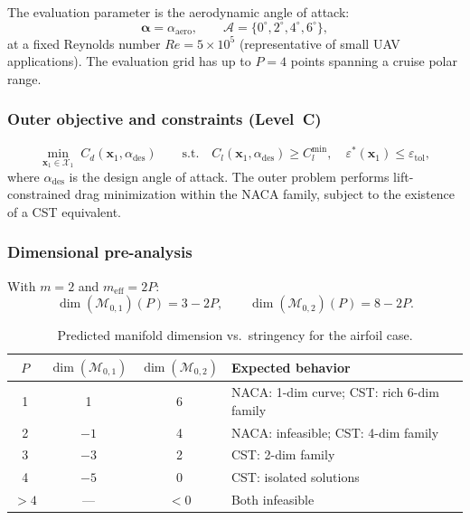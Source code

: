 The evaluation parameter is the aerodynamic angle of attack:
\begin{equation}
    \boldsymbol{\alpha} = \alpha_{\mathrm{aero}}, \qquad
    \mathcal{A} = \{0^\circ, 2^\circ, 4^\circ, 6^\circ\},
\end{equation}
at a fixed Reynolds number $Re = 5 \times 10^5$ (representative of small UAV applications). The evaluation grid has up to $P = 4$ points spanning a cruise polar range.


\subsubsection{Outer objective and constraints (Level~C)}

\begin{equation}
    \min_{\mathbf{x}_1 \in \mathcal{X}_1}\; C_d(\mathbf{x}_1, \alpha_{\mathrm{des}})
    \qquad \text{s.t.} \quad
    C_l(\mathbf{x}_1, \alpha_{\mathrm{des}}) \geq C_l^{\min},
    \quad \varepsilon^*(\mathbf{x}_1) \leq \varepsilon_{\mathrm{tol}},
    \label{eq:airfoil_outer}
\end{equation}
where $\alpha_{\mathrm{des}}$ is the design angle of attack. The outer problem performs lift-constrained drag minimization within the NACA family, subject to the existence of a CST equivalent.


\subsubsection{Dimensional pre-analysis}

With $m = 2$ and $m_{\mathrm{eff}} = 2P$:
\begin{equation}
    \dim(\mathcal{M}_{0,1})(P) = 3 - 2P, \qquad
    \dim(\mathcal{M}_{0,2})(P) = 8 - 2P.
\end{equation}

\begin{table}[h]
\centering
\caption{Predicted manifold dimension vs.\ stringency for the airfoil case.}
\label{tab:airfoil_dim}
\small
\begin{tabular}{cccl}
\hline
$P$ & $\dim(\mathcal{M}_{0,1})$ & $\dim(\mathcal{M}_{0,2})$ & Expected behavior \\
\hline
1 & 1 & 6 & NACA: 1-dim curve; CST: rich 6-dim family \\
2 & $-1$ & 4 & NACA: infeasible; CST: 4-dim family \\
3 & $-3$ & 2 & CST: 2-dim family \\
4 & $-5$ & 0 & CST: isolated solutions \\
$>4$ & --- & $<0$ & Both infeasible \\
\hline
\end{tabular}
\end{table}

